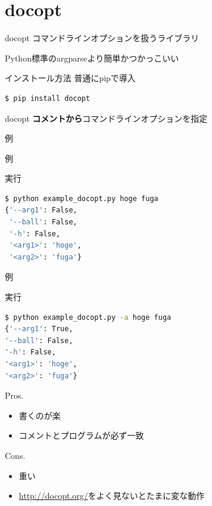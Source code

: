 \documentclass[12pt, xetex, xcolor=pdftex, dvipsnames]{beamer}
\begin{document}
\section{docopt}
\begin{frame}{docopt}
    コマンドラインオプションを扱うライブラリ

    Python標準のargparseより簡単かつかっこいい
\end{frame}
\begin{frame}{インストール方法}
    普通にpipで導入
    \begin{lstlisting}[language=Bash]
$ pip install docopt
    \end{lstlisting}
\end{frame}
\begin{frame}{docopt}
    \textbf{\alert{コメントから}}コマンドラインオプションを指定
\end{frame}
\begin{frame}[fragile]{例}
    
\end{frame}
\begin{frame}[fragile]{例}
    

    実行
    \begin{lstlisting}[language=Bash]
$ python example_docopt.py hoge fuga
{'--arg1': False,
 '--ball': False,
 '-h': False,
 '<arg1>': 'hoge',
 '<arg2>': 'fuga'}
    \end{lstlisting}
\end{frame}
\begin{frame}[fragile]{例}
    

    実行
    \begin{lstlisting}[language=Bash]
$ python example_docopt.py -a hoge fuga
{'--arg1': True,
'--ball': False,
'-h': False,
'<arg1>': 'hoge',
'<arg2>': 'fuga'}
    \end{lstlisting}
\end{frame}
\begin{frame}
    \begin{block}{Pros.}
        \begin{itemize}
            \item 書くのが楽
            \item コメントとプログラムが必ず一致
        \end{itemize}
    \end{block}
    \begin{block}{Cons.}
        \begin{itemize}
            \item 重い
            \item \url{http://docopt.org/}をよく見ないとたまに変な動作
        \end{itemize}
    \end{block}
\end{frame}
\end{document}
